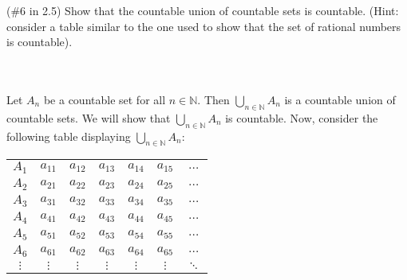(\#6 in 2.5) Show that the countable union of countable sets is countable. (Hint: consider a table
similar to the one used to show that the set of rational numbers is countable).\\\\


\begin{solution}\renewcommand{\qedsymbol}{}\ \\
    Let $A_n$ be a countable set for all $n\in\mathbb{N}$. Then $\bigcup_{n\in\mathbb{N}}A_n$ is a
    countable union of countable sets. We will show that $\bigcup_{n\in\mathbb{N}}A_n$ is countable.
    Now, consider the following table displaying $\bigcup_{n\in\mathbb{N}}A_n$:

        \begin{center}
            \begin{tabular}{ c|   c   c   c   c   c   c   }
                $A_1$ & $a_{11}$ & $a_{12}$ & $a_{13}$ & $a_{14}$ & $a_{15}$ & $\dots$ \\ 
                $A_2$ & $a_{21}$ & $a_{22}$ & $a_{23}$ & $a_{24}$ & $a_{25}$ & $\dots$ \\  
                $A_3$ & $a_{31}$ & $a_{32}$ & $a_{33}$ & $a_{34}$ & $a_{35}$ & $\dots$ \\
                $A_4$ & $a_{41}$ & $a_{42}$ & $a_{43}$ & $a_{44}$ & $a_{45}$ & $\dots$ \\
                $A_5$ & $a_{51}$ & $a_{52}$ & $a_{53}$ & $a_{54}$ & $a_{55}$ & $\dots$ \\
                $A_6$ & $a_{61}$ & $a_{62}$ & $a_{63}$ & $a_{64}$ & $a_{65}$ & $\dots$ \\
                $\vdots$ & $\vdots$ & $\vdots$ & $\vdots$ & $\vdots$ & $\vdots$ & $\ddots$ \\
            \end{tabular}
        \end{center}


\end{solution}

